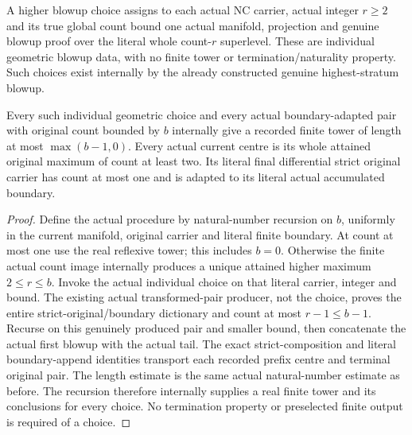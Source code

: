 \begin{definition}
\label{hir:general-nc-genuine-higher-blowup-choices}
\leanok
A higher blowup choice assigns to each actual NC carrier, actual
integer $r\ge2$ and its true global count bound one actual manifold,
projection and genuine blowup proof over the literal whole count-$r$
superlevel. These are individual geometric blowup data, with no
finite tower or termination/naturality property. Such choices exist
internally by the already constructed genuine highest-stratum blowup.
\end{definition}

\begin{theorem}
\label{hir:general-nc-actual-choice-separation-procedure}
\leanok
Every such individual geometric choice and every actual boundary-adapted
pair with original count bounded by $b$ internally give a recorded
finite tower of length at most $\max(b-1,0)$. Every actual current centre
is its whole attained original maximum of count at least two. Its
literal final differential strict original carrier has count at most
one and is adapted to its literal actual accumulated boundary.
\end{theorem}
\begin{proof}
Define the actual procedure by natural-number recursion on $b$,
uniformly in the current manifold, original carrier and literal
finite boundary. At count at most one use the real reflexive tower;
this includes $b=0$. Otherwise the finite actual count image internally
produces a unique attained higher maximum $2\le r\le b$. Invoke the
actual individual choice on that literal carrier, integer and bound.
The existing actual transformed-pair producer, not the choice, proves
the entire strict-original/boundary dictionary and count at most
$r-1\le b-1$. Recurse on this genuinely produced pair and smaller
bound, then concatenate the actual first blowup with the actual tail.
The exact strict-composition and literal boundary-append identities
transport each recorded prefix centre and terminal original pair.
The length estimate is the same actual natural-number estimate as
before. The recursion therefore internally supplies a real finite
tower and its conclusions for every choice. No termination property
or preselected finite output is required of a choice.
\end{proof}

